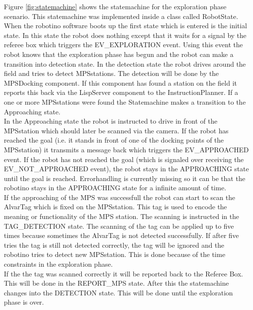 Figure \ref{fig:statemachine} shows the statemachine for the exploration phase scenario. This statemachine was implemented inside a class called RobotState. When the robotino software boots up the first state which is entered is the initial state. In this state the robot does nothing except that it waits for a signal by the referee box which triggers the EV\_EXPLORATION event. Using this event the robot knows that the exploration phase has begun and the robot can make a transition into detection state. In the detection state the robot drives around the field and tries to detect MPSstations. The detection will be done by the MPSDocking component. If this component has found a station on the field it reports this back via the LispServer component to the InstructionPlanner. If a one or more MPSstations were found the Statemachine makes a transition to the Approaching state. \\

In the Approaching state the robot is instructed to drive in front of the MPSstation which should later be scanned via the camera. If the robot has reached the goal (i.e. it stands in front of one of the docking points of the MPSstation) it transmits a message back which triggers the EV\_APPROACHED event. If the robot has not reached the goal (which is signaled over receiving the EV\_NOT\_APPROACHED event), the robot stays in the APPROACHING state until the goal is reached. Errorhandling is currently missing so it can be that the robotino stays in the APPROACHING state for a infinite amount of time. \\

If the approaching of the MPS was successfull the robot can start to scan the AlvarTag which is fixed on the MPSstation. This tag is used to encode the meaning or functionality of the MPS station. The scanning is instructed in the TAG\_DETECTION state. The scanning of the tag can be applied up to five times because sometimes the AlvarTag is not detected successfully. If after five tries the tag is still not detected correctly, the tag will be ignored and the robotino tries to detect new MPSstation. This is done because of the time constraints in the exploration phase. \\

If the the tag was scanned correctly it will be reported back to the Referee Box. This will be done in the REPORT\_MPS state. After this the statemachine changes into the DETECTION state. This will be done until the exploration phase is over.

